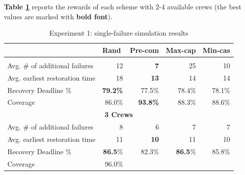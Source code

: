\documentclass[conference]{IEEEtran}
\begin{document}
\textbf{Table \ref{TB:single}} reports the rewards of each scheme with 2-4 available crews (the best values are marked with \textbf{bold font}).
\begin{table}
\centering
\caption{Experiment 1: single-failure simulation results}
\label{TB:single}
\begin{tabular}{|lrrrr|}
\hline
\rowcolor[HTML]{D9D9D9} 
\multicolumn{1}{|l|}{\cellcolor[HTML]{D9D9D9}Recovery schemes} &
  \multicolumn{1}{l|}{\cellcolor[HTML]{D9D9D9}Rand} &
  \multicolumn{1}{l|}{\cellcolor[HTML]{D9D9D9}Pre-com} &
  \multicolumn{1}{l|}{\cellcolor[HTML]{D9D9D9}Max-cap} &
  \multicolumn{1}{l|}{\cellcolor[HTML]{D9D9D9}Min-cas} \\ \hline
\rowcolor[HTML]{FFFFFF} 
\multicolumn{5}{|c|}{\textbf{2 Crews}} \\ \hline
\multicolumn{1}{|l|}{\cellcolor[HTML]{D9D9D9}Avg. \# of additional failures} &
  \multicolumn{1}{r|}{12} &
  \multicolumn{1}{r|}{\textbf{7}} &
  \multicolumn{1}{r|}{25} &
  10 \\ \hline
\multicolumn{1}{|l|}{\cellcolor[HTML]{D9D9D9}Avg. earliest restoration time} &
  \multicolumn{1}{r|}{18} &
  \multicolumn{1}{r|}{\textbf{13}} &
  \multicolumn{1}{r|}{14} &
  14 \\ \hline
\multicolumn{1}{|l|}{\cellcolor[HTML]{D9D9D9}Recovery Deadline \%} &
  \multicolumn{1}{r|}{\textbf{79.2\%}} &
  \multicolumn{1}{r|}{77.5\%} &
  \multicolumn{1}{r|}{78.4\%} &
  78.1\% \\ \hline
\multicolumn{1}{|l|}{\cellcolor[HTML]{D9D9D9}Coverage} &
  \multicolumn{1}{r|}{86.0\%} &
  \multicolumn{1}{r|}{\textbf{93.8\%}} &
  \multicolumn{1}{r|}{88.3\%} &
  88.6\% \\ \hline
\multicolumn{5}{|c|}{\textbf{3 Crews}} \\ \hline
\multicolumn{1}{|l|}{\cellcolor[HTML]{D9D9D9}Avg. \# of additional failures} &
  \multicolumn{1}{r|}{8} &
  \multicolumn{1}{r|}{6} &
  \multicolumn{1}{r|}{7} &
  7 \\ \hline
\multicolumn{1}{|l|}{\cellcolor[HTML]{D9D9D9}Avg. earliest restoration time} &
  \multicolumn{1}{r|}{11} &
  \multicolumn{1}{r|}{\textbf{10}} &
  \multicolumn{1}{r|}{11} &
  10 \\ \hline
\multicolumn{1}{|l|}{\cellcolor[HTML]{D9D9D9}Recovery Deadline \%} &
  \multicolumn{1}{r|}{\textbf{86.5}\%} &
  \multicolumn{1}{r|}{82.3\%} &
  \multicolumn{1}{r|}{\textbf{86.5}\%} &
  85.8\% \\ \hline
\multicolumn{1}{|l|}{\cellcolor[HTML]{D9D9D9}Coverage} &
  \multicolumn{1}{r|}{96.0\%} &

\end{tabular}
\end{table}
\end{document}
